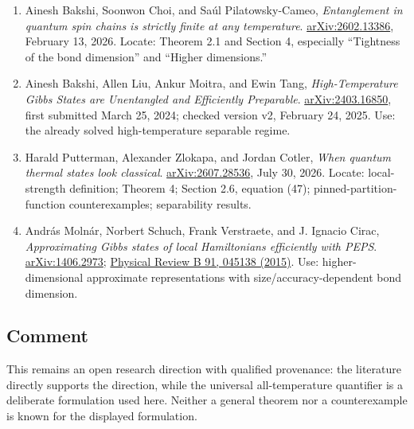 \begin{enumerate}[label={},leftmargin=4.8em,labelsep=0.5em]
  \footnotesize
  \item[\textup{[Bakshi26]}]\label{ref:eff5-bakshi26}
  Ainesh Bakshi, Soonwon Choi, and Saúl Pilatowsky-Cameo, \emph{Entanglement in quantum spin chains is strictly finite at any temperature}. \href{https://arxiv.org/abs/2602.13386}{arXiv:2602.13386}, February 13, 2026. Locate: Theorem 2.1 and Section 4, especially “Tightness of the bond dimension” and “Higher dimensions.”

  \item[\textup{[Bakshi24]}]\label{ref:eff5-bakshi24}
  Ainesh Bakshi, Allen Liu, Ankur Moitra, and Ewin Tang, \emph{High-Temperature Gibbs States are Unentangled and Efficiently Preparable}. \href{https://arxiv.org/abs/2403.16850}{arXiv:2403.16850}, first submitted March 25, 2024; checked version v2, February 24, 2025. Use: the already solved high-temperature separable regime.

  \item[\textup{[Putterman26]}]\label{ref:eff5-putterman26}
  Harald Putterman, Alexander Zlokapa, and Jordan Cotler, \emph{When quantum thermal states look classical}. \href{https://arxiv.org/abs/2607.28536}{arXiv:2607.28536}, July 30, 2026. Locate: local-strength definition; Theorem 4; Section 2.6, equation (47); pinned-partition-function counterexamples; separability results.

  \item[\textup{[Molnr15]}]\label{ref:eff5-molnr15}
  András Molnár, Norbert Schuch, Frank Verstraete, and J. Ignacio Cirac, \emph{Approximating Gibbs states of local Hamiltonians efficiently with PEPS}. \href{https://arxiv.org/abs/1406.2973}{arXiv:1406.2973}; \href{https://doi.org/10.1103/PhysRevB.91.045138}{Physical Review B 91, 045138 (2015)}. Use: higher-dimensional approximate representations with size/accuracy-dependent bond dimension.
\end{enumerate}

\subsection*{Comment}

This remains an open research direction with qualified provenance: the literature directly supports the direction, while the universal all-temperature quantifier is a deliberate formulation used here. Neither a general theorem nor a counterexample is known for the displayed formulation.

